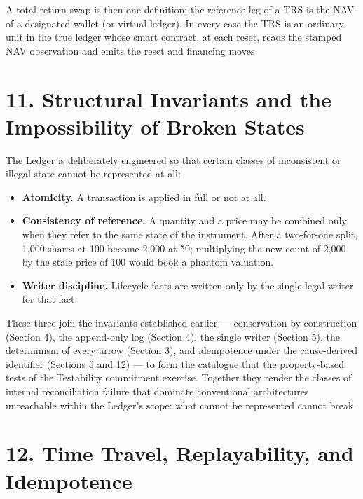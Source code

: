 \documentclass[11pt,a4paper]{article}
\newcommand{\clabel}[1]{\leavevmode\hypertarget{clause-#1}{}%
  \marginpar{\raggedright\scriptsize\ttfamily\textcolor{gray}{#1}}}
\providecommand{\tightlist}{\setlength{\itemsep}{2pt}\setlength{\parskip}{0pt}}
\begin{document}
\clabel{C-10.5}A total return swap is then one definition: the reference leg of a TRS
is the NAV of a designated wallet (or virtual ledger). In every case the
TRS is an ordinary unit in the true ledger whose smart contract, at each
reset, reads the stamped NAV observation and emits the reset and
financing moves.

\hypertarget{structural-invariants-and-the-impossibility-of-broken-states}{%
\section{11. Structural Invariants and the Impossibility of Broken
States}\label{structural-invariants-and-the-impossibility-of-broken-states}}

\clabel{C-11.1}The Ledger is deliberately engineered so that certain classes of
inconsistent or illegal state cannot be represented at all:

\begin{itemize}
\tightlist
\item
  \clabel{C-11.2}\textbf{Atomicity.} A transaction is applied in full or not at all.
\item
  \clabel{C-11.3}\textbf{Consistency of reference.} A quantity and a price may be
  combined only when they refer to the same state of the instrument.
  After a two-for-one split, 1,000 shares at 100 become 2,000 at 50;
  multiplying the new count of 2,000 by the stale price of 100 would
  book a phantom valuation.
\item
  \clabel{C-11.4}\textbf{Writer discipline.} Lifecycle facts are written only by the
  single legal writer for that fact.
\end{itemize}

\clabel{C-11.5}These three join the invariants established earlier --- conservation by
construction (Section 4), the append-only log (Section 4), the single
writer (Section 5), the determinism of every arrow (Section 3), and
idempotence under the cause-derived identifier (Sections 5 and 12) ---
to form the catalogue that the property-based tests of the Testability
commitment exercise. Together they render the classes of internal
reconciliation failure that dominate conventional architectures
unreachable within the Ledger's scope: what cannot be represented cannot
break.

\hypertarget{time-travel-replayability-and-idempotence}{%
\section{12. Time Travel, Replayability, and
Idempotence}\label{time-travel-replayability-and-idempotence}}
\end{document}
